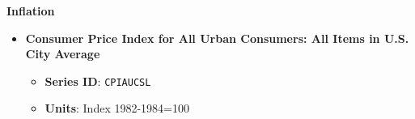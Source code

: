 \documentclass{article}
\begin{document}
\textbf{Inflation}
\begin{itemize}
  \item \textbf{Consumer Price Index for All Urban Consumers: All Items in U.S. City Average}
  \begin{itemize}
      \item \textbf{Series ID}: \texttt{CPIAUCSL}
      \item \textbf{Units}: Index 1982-1984=100
  \end{itemize}
\end{itemize}    

\newpage
\begin{refcontext}[sorting=nyt]
\printbibliography
\end{refcontext}
\end{document}

